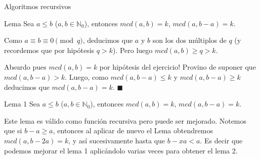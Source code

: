 \documentclass[compress]{beamer}
\begin{document}
\begin{frame}{Algoritmos recursivos}
	\begin{block}{Lema}
	Sea $a \leq b$ ($a, b \in \mathbb{N}_0$), entonces $mcd(a, b) = k$, $mcd(a, b-a) = k$.
	\end{block}
\bigskip

\pause
{}
\end{frame}

\begin{frame}
Como $a \equiv b \equiv 0 \pmod{q}$, deducimos que $a$ y $b$ son los dos m\'ultiplos de $q$ (y recordemos que por hip\'otesis $q > k$). 
Pero luego $mcd(a,b) \geq q > k$. \\ \bigskip

\textexclamdown Absurdo pues $mcd(a,b) = k$ por hip\'otesis del ejercicio! Provino de suponer que $mcd(a, b-a) > k$. Luego, 
como $mcd(a, b-a) \leq k$ y $mcd(a, b-a) \geq k$ deducimos que $mcd(a, b-a) = k$. $\blacksquare$

\end{frame}

\begin{frame}

\begin{block}{Lema 1}
	Sea $a \leq b$ ($a, b \in \mathbb{N}_0$), entonces $mcd(a, b) = k$, $mcd(a, b-a) = k$.
\end{block}

Este lema es v\'alido como funci\'on recursiva pero puede ser mejorado. Notemos que si $b-a \geq a$, entonces al aplicar de nuevo el Lema obtendremos
$mcd(a,b-2a) = k$, y as\'i sucesivamente hasta que $b-xa < a$. Es decir que podemos mejorar el lema 1 aplic\'andolo varias veces para obtener el lema 2.\\ \bigskip

\pause
{}
\end{frame}
\end{document}
